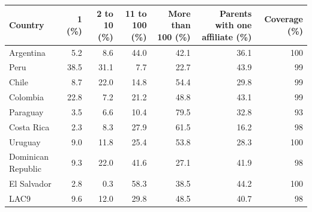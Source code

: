 \begin{tabular}{lrrrrrr}
\toprule
Country & 1 (\%) & 2 to 10 (\%) & 11 to 100 (\%) & More than 100 (\%) & Parents with one affiliate (\%) & Coverage (\%) \\
\midrule
Argentina & 5.2 & 8.6 & 44.0 & 42.1 & 36.1 & 100 \\
Peru & 38.5 & 31.1 & 7.7 & 22.7 & 43.9 & 99 \\
Chile & 8.7 & 22.0 & 14.8 & 54.4 & 29.8 & 99 \\
Colombia & 22.8 & 7.2 & 21.2 & 48.8 & 43.1 & 99 \\
Paraguay & 3.5 & 6.6 & 10.4 & 79.5 & 32.8 & 93 \\
Costa Rica & 2.3 & 8.3 & 27.9 & 61.5 & 16.2 & 98 \\
Uruguay & 9.0 & 11.8 & 25.4 & 53.8 & 28.3 & 100 \\
Dominican Republic & 9.3 & 22.0 & 41.6 & 27.1 & 41.9 & 98 \\
El Salvador & 2.8 & 0.3 & 58.3 & 38.5 & 44.2 & 100 \\
\midrule
LAC9 & 9.6 & 12.0 & 29.8 & 48.5 & 40.7 & 98 \\
\bottomrule
\end{tabular}
